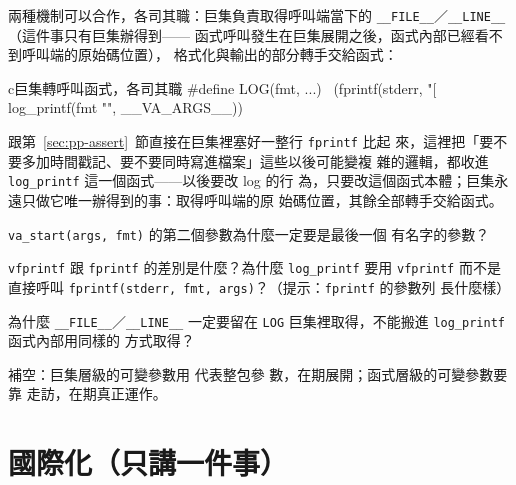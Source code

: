 兩種機制可以合作，各司其職：巨集負責取得呼叫端當下的
\texttt{\_\_FILE\_\_}／\texttt{\_\_LINE\_\_}（這件事只有巨集辦得到——
函式呼叫發生在巨集展開之後，函式內部已經看不到呼叫端的原始碼位置），
格式化與輸出的部分轉手交給函式：

\begin{code}{c}{巨集轉呼叫函式，各司其職}
#define LOG(fmt, ...) \
    (fprintf(stderr, "[%
     log_printf(fmt "\n", __VA_ARGS__))
\end{code}

跟第~\ref{sec:pp-assert}~節直接在巨集裡塞好一整行 \texttt{fprintf} 比起
來，這裡把「要不要多加時間戳記、要不要同時寫進檔案」這些以後可能變複
雜的邏輯，都收進 \texttt{log\_printf} 這一個函式——以後要改 log 的行
為，只要改這個函式本體；巨集永遠只做它唯一辦得到的事：取得呼叫端的原
始碼位置，其餘全部轉手交給函式。


\begin{drills}[label=drills:sl-variadic]
\item \texttt{va\_start(args, fmt)} 的第二個參數為什麼一定要是最後一個
有名字的參數？
\item \texttt{vfprintf} 跟 \texttt{fprintf} 的差別是什麼？為什麼
\texttt{log\_printf} 要用 \texttt{vfprintf} 而不是直接呼叫
\texttt{fprintf(stderr, fmt, args)}？（提示：\texttt{fprintf} 的參數列
長什麼樣）
\item 為什麼 \texttt{\_\_FILE\_\_}／\texttt{\_\_LINE\_\_} 一定要留在
\texttt{LOG} 巨集裡取得，不能搬進 \texttt{log\_printf} 函式內部用同樣的
方式取得？
\item 補空：巨集層級的可變參數用 \underline{\hspace{2em}} 代表整包參
數，在\underline{\hspace{2em}}期展開；函式層級的可變參數要靠
\underline{\hspace{2em}} 走訪，在\underline{\hspace{2em}}期真正運作。
\end{drills}

\section{國際化（只講一件事）}
\label{sec:sl-i18n}

